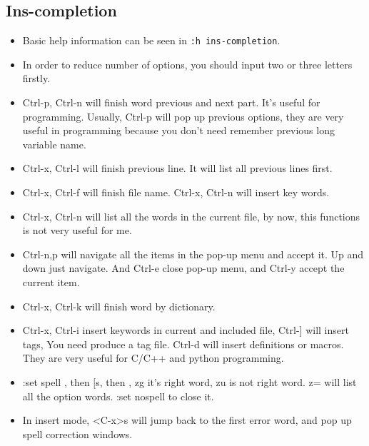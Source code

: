 \documentclass[a4paper,11pt,twoside]{book}
\begin{document}
\subsection{Ins-completion}
\begin{itemize}
		\item Basic help information can be seen in \texttt{:h ins-completion}. 

		\item In order to reduce number of options, you should input two or three letters firstly.

\item Ctrl-p, Ctrl-n will finish word previous and next part. It's useful for programming. Usually, Ctrl-p will pop up previous options, they are very useful in programming because you don't need remember previous long variable name. 

	   \item Ctrl-x, Ctrl-l will finish previous line. It will list all previous lines first. 

		\item Ctrl-x, Ctrl-f will finish file name. Ctrl-x, Ctrl-n will insert key words.
		
		\item Ctrl-x, Ctrl-n will list all the words in the current file, by now, this functions is not very useful for me. 

		\item Ctrl-n,p will navigate all the items in the pop-up menu and accept it. Up and down just navigate. And Ctrl-e close pop-up menu, and Ctrl-y accept the current item. 

		\item Ctrl-x, Ctrl-k will finish word by dictionary. 

		\item Ctrl-x, Ctrl-i insert keywords in current and included file,  Ctrl-] will insert tags, You need produce a tag file. Ctrl-d will insert definitions or macros. They are very useful for C/C++ and python programming.

		\item :set spell , then $[$s, then , zg it's right word,  zu is not right word. z= will list all the option words. :set nospell to close it.

		\item In insert mode, <C-x>s will jump back to the first error word, and pop up spell correction windows. 
\end{itemize}
\end{document}
